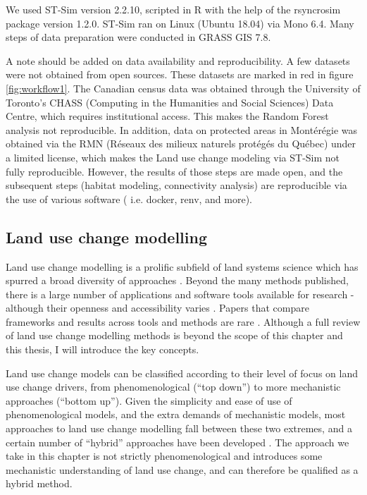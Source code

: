 We used ST-Sim version 2.2.10, scripted in R with the help of the rsyncrosim package version 1.2.0. ST-Sim ran on Linux (Ubuntu 18.04) via Mono 6.4. Many steps of data preparation were conducted in GRASS GIS 7.8.

A note should be added on data availability and reproducibility. A few datasets were not obtained from open sources. These datasets are marked in red in figure \ref{fig:workflow1}. The Canadian census data was obtained through the University of Toronto's CHASS (Computing in the Humanities and Social Sciences) Data Centre, which requires institutional access. This makes the Random Forest analysis not reproducible. In addition, data on protected areas in Montérégie was obtained  via the RMN (Réseaux des milieux naturels protégés du Québec) under a limited license, which makes the Land use change modeling via ST-Sim not fully reproducible. However, the results of those steps are made open, and the subsequent steps (habitat modeling, connectivity analysis) are reproducible via the use of various software ( i.e. docker, renv, and more). \\

\subsection{Land use change modelling}
Land use change modelling is a prolific subfield of land systems science which has spurred a broad diversity of approaches \citep{dang_review_2016, noszczyk_review_2018}. Beyond the many methods published, there is a large number of applications and software tools available for research - although their openness and accessibility varies \citep{moulds_open_2015}. Papers that compare frameworks and results across tools and methods are rare \citep{pontius_comparing_2008, pontius_comparison_2005, sun_comparison_2018}. Although a full review of land use change modelling methods is beyond the scope of this chapter and this thesis, I will introduce the key concepts.

Land use change models can be classified according to their level of focus on land use change drivers, from phenomenological (“top down”) to more mechanistic approaches (“bottom up”). Given the simplicity and ease of use of phenomenological models, and the extra demands of mechanistic models, most approaches to land use change modelling fall between these two extremes, and a certain number of “hybrid” approaches have been developed \citep{sun_comparison_2018, jokar_arsanjani_integration_2013}. The approach we take in this chapter is not strictly phenomenological and introduces some mechanistic understanding of land use change, and can therefore be qualified as a hybrid method.

